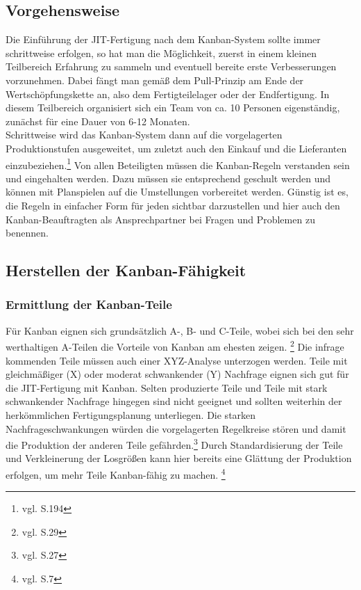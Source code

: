 \subsection{Vorgehensweise}
Die Einführung der JIT-Fertigung nach dem Kanban-System sollte immer schrittweise erfolgen,
so hat man die Möglichkeit, zuerst in einem kleinen Teilbereich Erfahrung zu 
sammeln und eventuell bereite erste Verbesserungen vorzunehmen. 
Dabei fängt man gemäß dem Pull-Prinzip am Ende der Wertschöpfungskette an, 
also dem Fertigteilelager oder der Endfertigung. 
In diesem Teilbereich organisiert sich ein Team von ca. 10 Personen eigenständig, zunächst für eine Dauer von 6-12 Monaten.\\
Schrittweise wird das Kanban-System dann auf die vorgelagerten Produktionstufen ausgeweitet, 
um zuletzt auch den Einkauf und die Lieferanten einzubeziehen.\footnote{vgl. \cite{Takeda2012SPS} S.194}
Von allen Beteiligten müssen die Kanban-Regeln verstanden sein und eingehalten werden. 
Dazu müssen sie entsprechend geschult werden und können mit Planspielen auf die Umstellungen vorbereitet werden.
Günstig ist es, die Regeln in einfacher Form für jeden sichtbar darzustellen und hier auch den 
Kanban-Beauftragten als Ansprechpartner bei Fragen und Problemen zu benennen.

\subsection{Herstellen der Kanban-Fähigkeit}
\subsubsection{Ermittlung der Kanban-Teile}
Für Kanban eignen sich grundsätzlich A-, B- und C-Teile, wobei sich bei den sehr 
werthaltigen A-Teilen die Vorteile von Kanban am ehesten zeigen. \footnote{vgl. \cite{Geiger2011Kanban} S.29}
Die infrage kommenden Teile müssen auch einer XYZ-Analyse unterzogen werden. 
Teile mit gleichmäßiger (X) oder moderat schwankender (Y) Nachfrage eignen sich gut für die JIT-Fertigung mit Kanban.
Selten produzierte Teile und Teile mit stark schwankender Nachfrage hingegen sind nicht geeignet und sollten 
weiterhin der herkömmlichen Fertigungsplanung unterliegen. Die starken Nachfrageschwankungen 
würden die vorgelagerten Regelkreise stören und damit die Produktion der anderen Teile gefährden.\footnote{vgl. \cite{Geiger2011Kanban} S.27}
Durch Standardisierung der Teile und Verkleinerung der Losgrößen kann hier 
bereits eine Glättung der Produktion erfolgen, um mehr Teile Kanban-fähig zu machen. \footnote{vgl. \cite{Takeda2012SPS} S.7}

